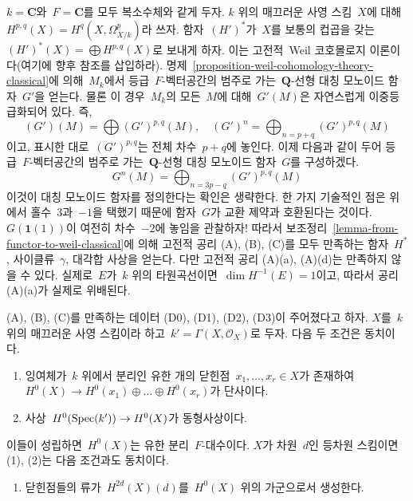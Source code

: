 \begin{example}
\label{example-weird-weil}
$k = \mathbf{C}$와\  $F = \mathbf{C}$를 모두 복소수체와 같게 두자.
$k$ 위의 매끄러운 사영 스킴\  $X$에 대해\ 
$H^{p, q}(X) = H^q(X, \Omega^p_{X/k})$라 쓰자. 함자\  $(H')^*$가\ 
$X$를 보통의 컵곱을 갖는\  $(H')^*(X) = \bigoplus H^{p, q}(X)$로
보내게 하자. 이는 고전적\  Weil 코호몰로지 이론이다(여기에 향후
참조를 삽입하라). 명제\ 
\ref{proposition-weil-cohomology-theory-classical}에 의해\  $M_k$에서
등급\  $F$-벡터공간의 범주로 가는\  $\mathbf{Q}$-선형 대칭 모노이드
함자\  $G'$을 얻는다. 물론 이 경우\  $M_k$의 모든\  $M$에 대해\ 
$G'(M)$은 자연스럽게 이중등급화되어 있다. 즉,
$$
(G')(M) = \bigoplus (G')^{p, q}(M),\quad
(G')^n = \bigoplus\nolimits_{n = p + q} (G')^{p, q}(M)
$$
이고, 표시한 대로\  $(G')^{p, q}$는 전체 차수\  $p + q$에 놓인다.
이제 다음과 같이 두어 등급\  $F$-벡터공간의 범주로 가는\ 
$\mathbf{Q}$-선형 대칭 모노이드 함자\  $G$를 구성하겠다.
$$
G^n(M) = \bigoplus\nolimits_{n = 3p - q} (G')^{p, q}(M)
$$
이것이 대칭 모노이드 함자를 정의한다는 확인은 생략한다. 한 가지
기술적인 점은 위에서 홀수\  $3$과\  $-1$을 택했기 때문에 함자\  $G$가
교환 제약과 호환된다는 것이다.
$G(\mathbf{1}(1))$이 여전히 차수\  $-2$에 놓임을 관찰하자!
따라서 보조정리\  \ref{lemma-from-functor-to-weil-classical}에 의해
고전적 공리 (A), (B), (C)를 모두 만족하는 함자\  $H^*$, 사이클류\ 
$\gamma$, 대각합 사상을 얻는다. 다만 고전적 공리 (A)(a), (A)(d)는
만족하지 않을 수 있다. 실제로\  $E$가\  $k$ 위의 타원곡선이면\ 
$\dim H^{-1}(E) = 1$이고, 따라서 공리 (A)(a)가 실제로 위배된다.
\end{example}

\begin{lemma}
\label{lemma-H-0-separable}
(A), (B), (C)를 만족하는 데이터 (D0), (D1), (D2), (D3)이
주어졌다고 하자. $X$를\  $k$ 위의 매끄러운 사영 스킴이라 하고\ 
$k' = \Gamma(X, \mathcal{O}_X)$로 두자. 다음 두 조건은 동치이다.
\begin{enumerate}
\item 잉여체가\  $k$ 위에서 분리인 유한 개의 닫힌점\ 
$x_1, \ldots, x_r \in X$가 존재하여\ 
$H^0(X) \to H^0(x_1) \oplus \ldots \oplus H^0(x_r)$가 단사이다.
\item 사상\  $H^0(\mathop{\mathrm{Spec}}(k')) \to H^0(X)$가 동형사상이다.
\end{enumerate}
이들이 성립하면\  $H^0(X)$는 유한 분리\  $F$-대수이다. $X$가 차원\ 
$d$인 등차원 스킴이면 (1), (2)는 다음 조건과도 동치이다.
\begin{enumerate}
\item[(3)] 닫힌점들의 류가\  $H^{2d}(X)(d)$를\  $H^0(X)$ 위의
가군으로서 생성한다.
\end{enumerate}
\end{lemma}

